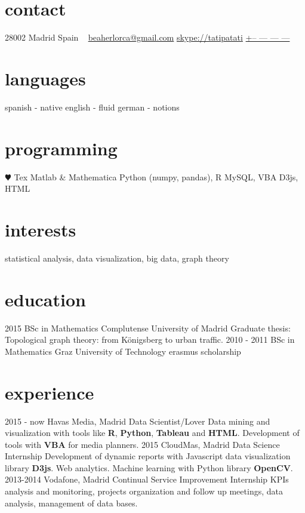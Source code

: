 \documentclass[]{friggeri-cv}
\begin{document}
\ifenglish
{}
       {}


\begin{aside}
  \section{contact}
    28002 Madrid
    Spain
    ~
    \href{mailto:beaherlorca@gmail.com}{beaherlorca@gmail.com}
    \href{skype:<tatipatati>[add]}{skype://tatipatati}
    \href{tel:xxxxxxxxxxx}{+-- --- --- ---}
  \section{languages}
    spanish - native
    english - fluid
    german - notions
  \section{programming}
    {\color{red} $\varheartsuit$} Tex
    Matlab \& Mathematica
    Python (numpy, pandas), R
    MySQL, VBA
    D3js, HTML
\end{aside}

\section{interests}

statistical analysis, data visualization, big data, graph theory

\section{education}

\begin{entrylist}
  \entry
    {2015}
    {BSc in Mathematics}
    {Complutense University of Madrid}
    {Graduate thesis: Topological graph theory: from Königsberg to urban traffic.}
  \entry
    {2010 - 2011}
    {BSc in Mathematics}
    {Graz University of Technology}
    {erasmus scholarship}
\end{entrylist}

\section{experience}

\begin{entrylist}
  \entry
    {2015 - now}
    {Havas Media, Madrid}
    {Data Scientist/Lover}
    {Data mining and visualization with tools like \textbf{R}, \textbf{Python}, \textbf{Tableau} and \textbf{HTML}. Development of tools with \textbf{VBA} for media planners.}
  \entry
    {2015}
    {CloudMas, Madrid}
    {Data Science Internship}
    {Development of dynamic reports with Javascript data visualization library \textbf{D3js}. Web analytics. Machine learning with Python library \textbf{OpenCV}.}
  \entry
    {2013-2014}
    {Vodafone, Madrid}
    {Continual Service Improvement Internship}
    {KPIs analysis and monitoring, projects organization and follow up meetings, data analysis, management of data bases.}
\end{entrylist}
\end{document}
